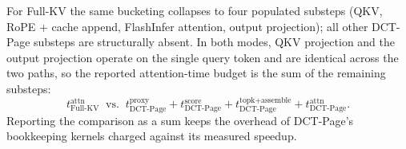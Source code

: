 For Full-KV the same bucketing collapses to four populated substeps
(QKV, RoPE + cache append, FlashInfer attention, output projection);
all other DCT-Page substeps are structurally absent.  In both modes,
QKV projection and the output projection operate on the single query
token and are identical across the two paths, so the reported
attention-time budget is the sum of the remaining substeps:
\begin{equation*}
  t_\text{Full-KV}^{\text{attn}}
  \;\;\text{vs.}\;\;
  t_\text{DCT-Page}^{\text{proxy}}
  + t_\text{DCT-Page}^{\text{score}}
  + t_\text{DCT-Page}^{\text{topk+assemble}}
  + t_\text{DCT-Page}^{\text{attn}}.
\end{equation*}
Reporting the comparison as a sum keeps the overhead of DCT-Page's
bookkeeping kernels charged against its measured speedup.
